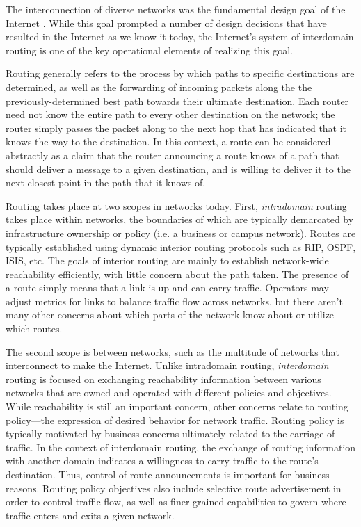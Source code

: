 The interconnection of diverse networks was the fundamental design goal of the Internet \cite{Clark:1988kl}. While this goal prompted a number of design decisions that have resulted in the Internet as we know it today, the Internet's system of interdomain routing is one of the key operational elements of realizing this goal.

Routing generally refers to the process by which paths to specific destinations are determined, as well as the forwarding of incoming packets along the the previously-determined best path towards their ultimate destination. Each router need not know the entire path to every other destination on the network; the router simply passes the packet along to the next hop that has indicated that it knows the way to the destination. In this context, a route can be considered abstractly as a claim that the router announcing a route knows of a path that should deliver a message to a given destination, and is willing to deliver it to the next closest point in the path that it knows of.

Routing takes place at two scopes in networks today. First, \emph{intradomain} routing takes place within networks, the boundaries of which are typically demarcated by infrastructure ownership or policy (i.e. a business or campus network). Routes are typically established using dynamic interior routing protocols such as RIP, OSPF, ISIS, etc. The goals of interior routing are mainly to establish network-wide reachability efficiently, with little concern about the path taken. The presence of a route simply means that a link is up and can carry traffic. Operators may adjust metrics for links to balance traffic flow across networks, but there aren't many other concerns about which parts of the network know about or utilize which routes.

The second scope is between networks, such as the multitude of networks that interconnect to make the Internet. Unlike intradomain routing, \emph{interdomain} routing is focused on exchanging reachability information between various networks that are owned and operated with different policies and objectives. While reachability is still an important concern, other concerns relate to routing policy---the expression of desired behavior for network traffic. Routing policy is typically motivated by business concerns ultimately related to the carriage of traffic. In the context of interdomain routing, the exchange of routing information with another domain indicates a willingness to carry traffic to the route's destination. Thus, control of route announcements is important for business reasons. Routing policy objectives also include selective route advertisement in order to control traffic flow, as well as finer-grained capabilities to govern where traffic enters and exits a given network.

